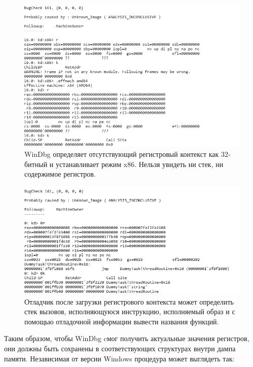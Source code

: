 \documentclass{mipt-thesis-bs}
\begin{document}
\begin{figure}[h]
\begin{center}
    \captionsetup{justification=centering}
    \includegraphics[width=1\textwidth]{ctx1.png}
    \caption{WinDbg определяет отсутствующий регистровый контекст как 32-битный и устанавливает режим x86. Нельзя увидеть ни стек, ни содержимое регистров.}
    \label{fig:ctx1}
\end{center}
\end{figure}

\begin{figure}[h]
\begin{center}
    \captionsetup{justification=centering}
    \includegraphics[width=1\textwidth]{ctx2.png}
    \caption{Отладчик после загрузки регистрового контекста может определить стек вызовов, исполняющуюся инструкцию, исполняемый образ и с помощью отладочной информации вывести названия функций.}
    \label{fig:ctx2}
\end{center}
\end{figure}

\newpage
Таким образом, чтобы WinDbg cмог получить актуальные значения регистров, они должны быть сохранены в соответствующих структурах внутри дампа памяти. Независимая от версии Windows процедура может выглядеть так:
\end{document}
